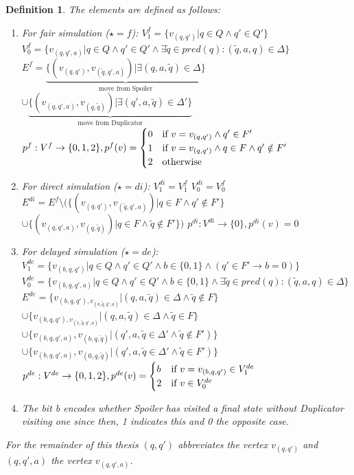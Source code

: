 \documentclass[12pt,oneside,bibliography=totoc,abstracton]{scrartcl}
\newtheorem{mydef}{Definition}
\begin{document}
\begin{mydef}
	The elements are defined as follows:
	\begin{enumerate}
		\item For fair simulation ($\star = f$):
			\subitem $V_1^f = \{v_{(q,q')} | q \in Q \land q' \in Q'\}$
			\subitem $V_0^f = \{v_{(q, q', a)} | q \in Q \land q' \in Q' \land \exists \tilde{q} \in pred(q) : (\tilde{q}, a, q) \in \Delta\}$
			\subitem $E^f = \underbrace{\{(v_{(q, q')}, v_{(\tilde{q}, q', a)}) | \exists (q, a, \tilde{q}) \in \Delta\}}_{\text{move from Spoiler}}$
				\subsubitem $\cup \underbrace{\{(v_{(q, q', a)}, v_{(q, \tilde{q})}) |
					\exists (q', a, \tilde{q}) \in \Delta'\}}_{\text{move from Duplicator}}$
			\subitem $p^f: V^f \to \{0, 1, 2\}, p^f(v) = \begin{cases} 0 & \textnormal{if } v = v_{(q, q')} \land q' \in F'\\
				1 & \textnormal{if } v = v_{(q, q')} \land q \in F \land q' \notin F'\\
				2 & \textnormal{otherwise}
				\end{cases}$
		\item For direct simulation ($\star = di$):
			\subitem $V_1^{di} = V_1^f$
			\subitem $V_0^{di} = V_0^f$
			\subitem $E^{di} = E^f \setminus (\{(v_{(q, q')}, v_{(\tilde{q}, q', a)}) | q \in F \land q' \notin F'\}$
				\subsubitem $\cup \{(v_{(q, q', a)}, v_{(q, \tilde{q})}) | q \in F \land \tilde{q} \notin F'\})$
			\subitem $p^{di}: V^{di} \to \{0\}, p^{di}(v) = 0$
		\item For delayed simulation ($\star = de$):
			\subitem $V_1^{de} = \{v_{(b, q, q')} | q \in Q \land q' \in Q' \land b \in \{0, 1\} \land (q' \in F' \rightarrow b = 0)\}$
			\subitem $V_0^{de} = \{v_{(b, q, q', a)} | q \in Q \land q' \in Q' \land b \in \{0, 1\} \land \exists \tilde{q} \in pred(q) : (\tilde{q}, a, q) \in \Delta\}$
			\subitem $E^{de} = \{v_{(b, q, q'), v_{(b, \tilde{q}, q', a)}} | (q, a, \tilde{q}) \in \Delta \land \tilde{q} \notin F\}$
				\subsubitem $\cup \{v_{(b, q, q'), v_{(1, \tilde{q}, q', a)}} | (q, a, \tilde{q}) \in \Delta \land \tilde{q} \in F\}$
				\subsubitem $\cup \{v_{(b, q, q', a)}, v_{(b, q, \tilde{q})} | (q', a, \tilde{q} \in \Delta' \land \tilde{q} \notin F')\}$
				\subsubitem $\cup \{v_{(b, q, q', a)}, v_{(0, q, \tilde{q})} | (q', a, \tilde{q} \in \Delta' \land \tilde{q} \in F')\}$
			\subitem $p^{de}: V^{de} \to \{0, 1, 2\}, p^{de}(v) = \begin{cases} b & \textnormal{if } v = v_{(b, q, q')} \in V^{de}_1\\
				2 & \textnormal{if } v \in V^{de}_0
				\end{cases}$
		\item[] The bit \textnormal{b} encodes whether Spoiler has visited a final state
			without Duplicator visiting one since then, 1 indicates this and 0 the opposite case.
	\end{enumerate}
	For the remainder of this thesis $(q, q')$ abbreviates the vertex $v_{(q, q')}$ and $(q, q', a)$ the vertex $v_{(q, q', a)}$.
\end{mydef}\quad\\
\end{document}
